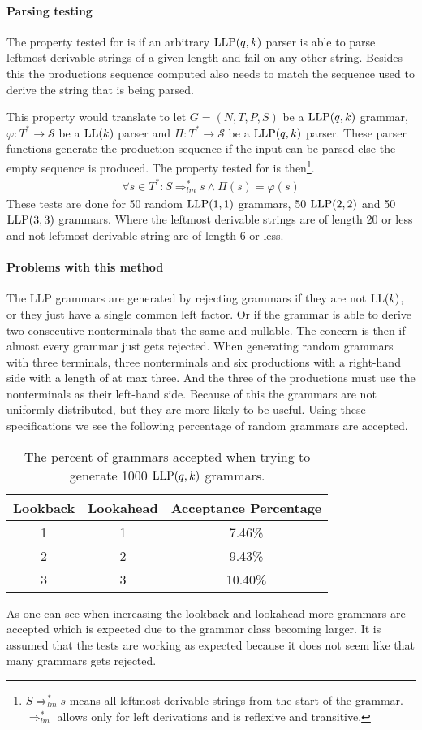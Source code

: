 \paragraph{Parsing testing}
The property tested for is if an arbitrary $\text{LLP}(q,k)$ parser is able to parse leftmost derivable strings of a given length and fail on any other string. Besides this the productions sequence computed also needs to match the sequence used to derive the string that is being parsed.

This property would translate to let $G = (N, T, P, S)$ be a $\text{LLP}(q, k)$ grammar, $\varphi : T^* \to \mathcal{S}$ be a $\text{LL}(k)$ parser and $\Pi : T^* \to \mathcal{S}$ be a $\text{LLP}(q, k)$ parser. These parser functions generate the production sequence if the input can be parsed else the empty sequence is produced. The property tested for is then\footnote{$S \Rightarrow^*_{lm} s$ means all leftmost derivable strings from the start of the grammar. $\Rightarrow^*_{lm}$ allows only for left derivations and is reflexive and transitive.}.
\begin{align*}
    \forall s \in T^* : S \Rightarrow^*_{lm} s \land \Pi(s) = \varphi(s)
\end{align*}
These tests are done for 50 random $\text{LLP}(1,1)$ grammars, 50 $\text{LLP}(2,2)$ and 50 $\text{LLP}(3,3)$ grammars. Where the leftmost derivable strings are of length 20 or less and not leftmost derivable string are of length 6 or less.

\paragraph{Problems with this method}
The LLP grammars are generated by rejecting grammars if they are not $\text{LL}(k)$, or they just have a single common left factor. Or if the grammar is able to derive two consecutive nonterminals that the same and nullable. The concern is then if almost every grammar just gets rejected. When generating random grammars with three terminals, three nonterminals and six productions with a right-hand side with a length of at max three. And the three of the productions must use the nonterminals as their left-hand side. Because of this the grammars are not uniformly distributed, but they are more likely to be useful. Using these specifications we see the following percentage of random grammars are accepted.
\begin{table}[H]
    \centering
    \begin{tabular}{c|c|c}
        Lookback & Lookahead & Acceptance Percentage  \\ \hline
        1 & 1 & 7.46\%  \\\hline
        2 & 2 & 9.43\%  \\\hline
        3 & 3 & 10.40\%
    \end{tabular}
    \caption{The percent of grammars accepted when trying to generate 1000 $\text{LLP}(q, k)$ grammars.}
\end{table}
\noindent As one can see when increasing the lookback and lookahead more grammars are accepted which is expected due to the grammar class becoming larger. It is assumed that the tests are working as expected because it does not seem like that many grammars gets rejected.